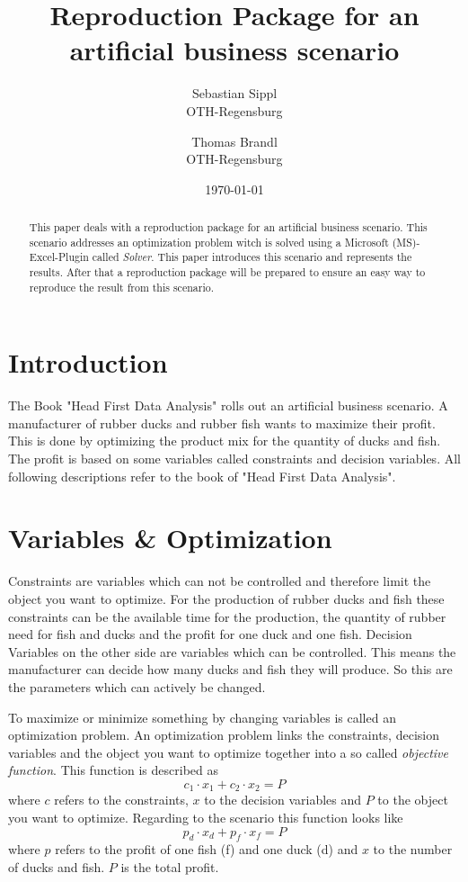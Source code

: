 \documentclass{article}
\title{\textbf{Reproduction Package for an artificial business scenario}}
\author{Sebastian Sippl  \\
	OTH-Regensburg  \\
	\and 
	Thomas Brandl \\
	OTH-Regensburg  \\
	}
\date{\today}
\begin{document}
\maketitle
\begin{abstract}
This paper deals with a reproduction package for an artificial business scenario. This scenario addresses an optimization problem witch is solved using a Microsoft (MS)-Excel-Plugin called \textit{Solver}. This paper introduces this scenario and represents the results. After that a reproduction package will be prepared to ensure an easy way to reproduce the result from this scenario.
\end{abstract}

\begin{multicols}{2}

\section{Introduction}
The Book "Head First Data Analysis" \cite{micheal} rolls out an artificial business scenario. A manufacturer of rubber ducks and rubber fish wants to maximize their profit. This is done by optimizing the product mix for the quantity of ducks and fish. The profit is based on some variables called constraints and decision variables. All following descriptions refer to the book of "Head First Data Analysis".

\section{Variables \& Optimization}
Constraints are variables which can not be controlled and therefore limit the object you want to optimize. For the production of rubber ducks and fish these constraints can be the available time for the production, the quantity of rubber need for fish and ducks and the profit for one duck and one fish. Decision Variables on the other side are variables which can be controlled. This means the manufacturer can decide how many ducks and fish they will produce. So this are the parameters which can actively be changed. 

To maximize or minimize something by changing variables is called an optimization problem. An optimization problem links the constraints, decision variables and the object you want to optimize together into a so called \textit{objective function}. This function is described as 
\begin{equation}
c_{1}\cdot x_{1} + c_{2}\cdot x_{2} = P
\end{equation}
where $c$ refers to the constraints, $x$ to the decision variables and $P$ to the object you want to optimize. Regarding to the scenario this function looks like 
\begin{equation}
p_{d}\cdot x_{d} + p_{f}\cdot x_{f} = P
\end{equation}
where $p$ refers to the profit of one fish (f) and one duck (d) and $x$ to the number of ducks and fish. $P$ is the total profit.


\end{multicols}
\end{document}
